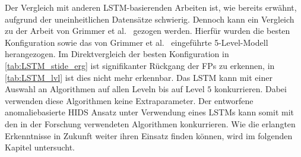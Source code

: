Der Vergleich mit anderen \ac{LSTM}-basierenden Arbeiten ist, wie bereits erwähnt, aufgrund der uneinheitlichen Datensätze schwierig.
Dennoch kann ein Vergleich zu der Arbeit von Grimmer et al.~\cite{IDSTHREADGRIMMER2021} gezogen werden.
Hierfür wurden die besten Konfiguration sowie das von Grimmer et al.~\cite{IDSTHREADGRIMMER2021} eingeführte 5-Level-Modell herangezogen.
Im Direktvergleich der besten Konfiguration in \autoref{tab:LSTM_stide_erg} ist signifikanter Rückgang der \acp{FP} zu erkennen, in \autoref{tab:LSTM_lvl} ist dies nicht mehr erkennbar.
Das \ac{LSTM} kann mit einer Auswahl an Algorithmen auf allen Leveln bis auf Level $5$ konkurrieren.
Dabei verwenden diese Algorithmen keine Extraparameter.
Der entworfene anomaliebasierte \ac{HIDS} Ansatz unter Verwendung eines \acp{LSTM} kann somit mit den in der Forschung verwendeten Algorithmen konkurrieren.
Wie die erlangten Erkenntnisse in Zukunft weiter ihren Einsatz finden können, wird im folgenden Kapitel untersucht.

